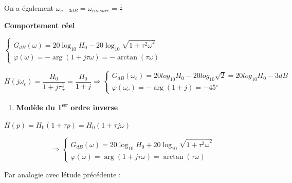 On a également \(\omega_{c - 3dB} = \omega_{cassure} = \frac{1}{\tau}\)

\textbf{Comportement réel}

\(\left\{ \begin{array}{r}
G_{dB}(\omega) = 20\log_{10}H_{0} - 20\log_{10}\sqrt{1 + {\tau^{2}\omega}^{2}} \\
\varphi(\omega) = - \arg(1 + j\tau\omega) = - \arctan(\tau\omega)
\end{array} \right.\ \)

\[H\left( j\omega_{c} \right) = \frac{H_{0}}{1 + j\tau\frac{1}{\tau}} = \frac{H_{0}}{1 + j} \Longrightarrow \left\{ \begin{array}{r}
G_{dB}\left( \omega_{c} \right) = 20{log_{10}}H_{0} - 20{log_{10}}\sqrt{2} = 20{log_{10}}H_{0} - 3dB \\
\varphi\left( \omega_{c} \right) = - \arg(1 + j) = - 45{^\circ}
\end{array} \right.\ \]

\begin{enumerate}
\def\labelenumi{\arabic{enumi}.}
\setcounter{enumi}{5}
\item
  \protect\hypertarget{mod-_Toc494227268}{}{}\textbf{Modèle du 1\textsuperscript{er} ordre inverse}
\end{enumerate}

\(H(p) = H_{0}(1 + \tau p) = H_{0}(1 + \tau j\omega)\)

\[\mathbf{\Longrightarrow}\left\{ \begin{array}{r}
G_{dB}(\omega) = 20\log_{10}H_{0} + 20\log_{10}\sqrt{1 + {\tau^{2}\omega}^{2}} \\
\varphi(\omega) = \arg(1 + j\tau\omega) = \arctan(\tau\omega)
\end{array} \right.\ \]

Par analogie avec l\textquotesingle étude précédente :

